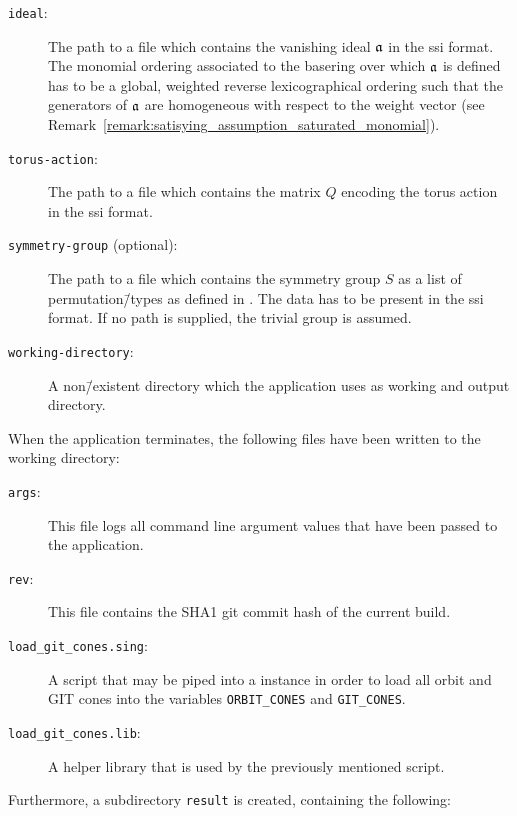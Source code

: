 \begin{description}
	\item[\texttt{ideal}:] The path to a file which contains the vanishing ideal $\mathfrak{a}$ in the \ac{ssi} format. The monomial ordering associated to the basering over which $\mathfrak{a}$ is defined has to be a global, weighted reverse lexicographical ordering such that the generators of $\mathfrak{a}$ are homogeneous with respect to the weight vector (see Remark~\ref{remark:satisying_assumption_saturated_monomial}).
	\item[\texttt{torus-action}:] The path to a file which contains the matrix $Q$ encoding the torus action in the \ac{ssi} format.
	\item[\texttt{symmetry-group} (optional):] The path to a file which contains the symmetry group $S$ as a list of permutation\=/types as defined in \gitfanlib{}. The data has to be present in the \ac{ssi} format. If no path is supplied, the trivial group is assumed.
	\item[\texttt{working-directory}:] A non\=/existent directory which the application uses as working and output directory.
\end{description}

When the application terminates, the following files have been written to the working directory:

\begin{description}
	\item[\texttt{args}:] This file logs all command line argument values that have been passed to the application.
	\item[\texttt{rev}:] This file contains the SHA1 git commit hash of the current build.
	\item[\texttt{load\_git\_cones.sing}:] A \singular{} script that may be piped into a \singular{} instance in order to load all orbit and GIT cones into the variables \texttt{ORBIT\_CONES} and \texttt{GIT\_CONES}.
	\item[\texttt{load\_git\_cones.lib}:] A helper library that is used by the previously mentioned script.
\end{description}

Furthermore, a subdirectory \texttt{result} is created, containing the following:

